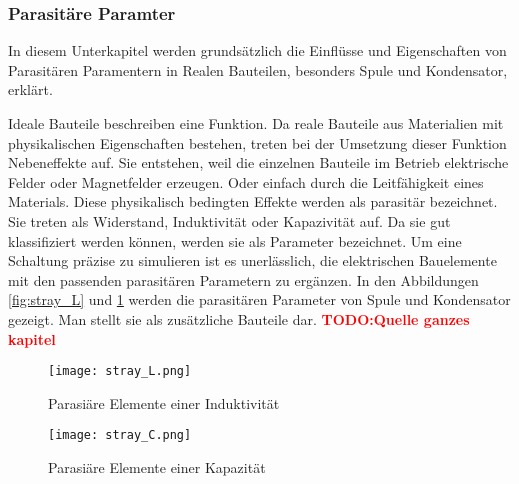 \subsubsection{Parasitäre Paramter}\label{subsec:parasitparam}
In diesem Unterkapitel werden grundsätzlich die Einflüsse und Eigenschaften von Parasitären Paramentern in Realen Bauteilen, besonders Spule und Kondensator, erklärt.

Ideale Bauteile beschreiben eine Funktion. Da reale Bauteile aus Materialien mit physikalischen Eigenschaften bestehen, treten bei der Umsetzung dieser Funktion Nebeneffekte auf. Sie entstehen, weil die einzelnen Bauteile im Betrieb elektrische Felder oder Magnetfelder erzeugen. Oder einfach durch die Leitfähigkeit eines Materials. Diese physikalisch bedingten Effekte werden als parasitär bezeichnet. Sie treten als Widerstand, Induktivität oder Kapazivität auf. Da sie gut klassifiziert werden können, werden sie als Parameter bezeichnet. 
Um eine Schaltung präzise zu simulieren ist es unerlässlich, die elektrischen Bauelemente mit den passenden parasitären Parametern zu ergänzen. In den Abbildungen \ref{fig:stray_L} und \ref{fig:stray_C} werden die parasitären Parameter von Spule und Kondensator gezeigt. Man stellt sie als zusätzliche Bauteile dar. \textcolor{red}{\textbf{TODO:Quelle ganzes kapitel}}


\begin{figure}[H]
	\begin{minipage}[h]{0.45\linewidth}
		\centering
		\texttt{[image: stray\_L.png]}
		\caption{Parasiäre Elemente einer Induktivität \cite{aufgabenstellung}}
		\label{fig:stray_L}
	\end{minipage}	
	\begin{minipage}[h]{0.45\linewidth}
		\centering
		\texttt{[image: stray\_C.png]}
		\caption{Parasiäre Elemente einer Kapazität \cite{aufgabenstellung}}
		\label{fig:stray_C}
	\end{minipage}
\end{figure}

\bigskip

